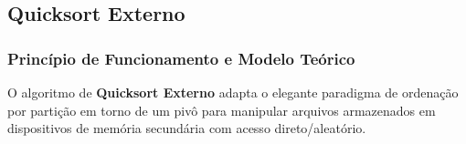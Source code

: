 \documentclass[12pt,a4paper]{article}
\begin{document}
\subsection{Quicksort Externo}
\label{subsec:metodo_quicksort}

\subsubsection{Princípio de Funcionamento e Modelo Teórico}
O algoritmo de \textbf{Quicksort Externo} adapta o elegante paradigma de ordenação por partição em torno de um pivô para manipular arquivos armazenados em dispositivos de memória secundária com acesso direto/aleatório.
\end{document}
